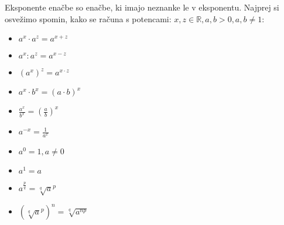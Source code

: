 Eksponente enačbe so enačbe, ki imajo neznanke le v eksponentu. Najprej si osvežimo spomin, kako se računa s potencami:
$x, z \in \mathbb{R}, a, b > 0, a, b \neq 1$:
%
\begin{multicols}{2}
\begin{itemize}
\item $a^x \cdot a^z = a^{x + z}$
\item $a^x : a^z = a^{x - z}$
\item $(a^x)^z = a^{x\cdot z}$
\item $a^x \cdot b^x = (a \cdot b)^x$
\item $\frac{a^x}{b^x} = (\frac{a}{b})^x$
\item $a^{-x} = \frac{1}{a^x}$
\item $a^0 = 1, a\neq 0$
\item$a^1 = a$
\item $a^{\frac{p}{q}} = \sqrt [q]a^p$
\item $(\sqrt[q]a^p)^n = \sqrt[q]{a^{np}}$
\end{itemize}
\end{multicols}

